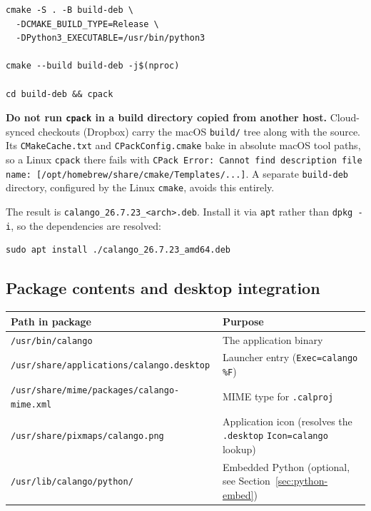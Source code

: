 \documentclass[11pt,a4paper]{article}
\newcommand{\file}[1]{\texttt{#1}}
\newcommand{\opt}[1]{\texttt{#1}}
\begin{document}
\begin{lstlisting}
cmake -S . -B build-deb \
  -DCMAKE_BUILD_TYPE=Release \
  -DPython3_EXECUTABLE=/usr/bin/python3

cmake --build build-deb -j$(nproc)

cd build-deb && cpack
\end{lstlisting}

\noindent\textbf{Do not run \opt{cpack} in a build directory copied from
another host.} Cloud-synced checkouts (Dropbox) carry the macOS
\file{build/} tree along with the source. Its \file{CMakeCache.txt} and
\file{CPackConfig.cmake} bake in absolute macOS tool paths, so a Linux
\opt{cpack} there fails with \texttt{CPack Error: Cannot find
description file name: [/opt/homebrew/share/cmake/Templates/...]}. A
separate \file{build-deb} directory, configured by the Linux \file{cmake},
avoids this entirely.

The result is \file{calango\_26.7.23\_<arch>.deb}. Install it via
\opt{apt} rather than \opt{dpkg -i}, so the dependencies are resolved:

\begin{lstlisting}
sudo apt install ./calango_26.7.23_amd64.deb
\end{lstlisting}

\subsection{Package contents and desktop integration}

\begin{center}
\small
\begin{tabular}{@{}lp{}@{}}
\toprule
Path in package & Purpose \\
\midrule
\file{/usr/bin/calango} & The application binary \\
\file{/usr/share/applications/calango.desktop} & Launcher entry
(\texttt{Exec=calango \%F}) \\
\file{/usr/share/mime/packages/calango-mime.xml} & MIME type for
\file{.calproj} \\
\file{/usr/share/pixmaps/calango.png} & Application icon (resolves the
\file{.desktop} \texttt{Icon=calango} lookup) \\
\file{/usr/lib/calango/python/} & Embedded Python (optional, see
Section~\ref{sec:python-embed}) \\
\bottomrule
\end{tabular}
\end{center}
\end{document}
